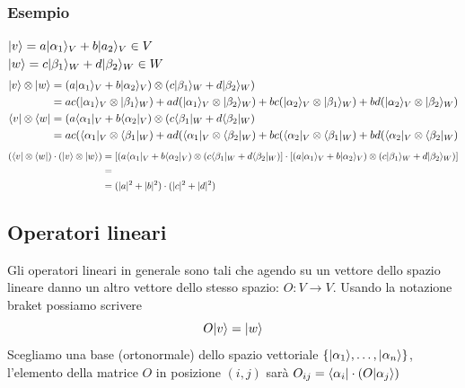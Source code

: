 \documentclass[12pt, a4paper]{report}
\begin{document}
\subsubsection{Esempio}
$| v \rangle = a| \alpha_{1} \rangle_{V}+b| a_{2} \rangle_{V}\in V$\\
$| w \rangle = c| \beta_{1} \rangle_{W}+d| \beta_{2} \rangle_{W}\in W$ 
\begin{equation*}
    \begin{split}
        | v \rangle\otimes| w \rangle & = (a| \alpha_{1} \rangle_{V}+b| \alpha_{2} \rangle_{V})\otimes(c| \beta_{1} \rangle_{W}+d| \beta_{2} \rangle_{W}) \\
        & = ac(| \alpha_{1} \rangle_{V}\otimes| \beta_{1} \rangle_{W})+ad(| \alpha_{1} \rangle_{V}\otimes| \beta_{2} \rangle_{W})+bc(| \alpha_{2} \rangle_{V}\otimes| \beta_{1} \rangle_{W})+bd(| \alpha_{2} \rangle_{V}\otimes| \beta_{2} \rangle_{W}) \\
        \langle v |\otimes\langle w | & = (a\langle \alpha_{1} |_{V}+b\langle \alpha_{2} |_{V})\otimes(c\langle \beta_{1} |_{W}+d\langle \beta_{2} |_{W}) \\
        & = ac(\langle \alpha_{1} |_{V}\otimes\langle \beta_{1} |_{W})+ad(\langle \alpha_{1} |_{V}\otimes\langle \beta_{2} |_{W})+bc(\langle \alpha_{2} |_{V}\otimes\langle \beta_{1} |_{W})+bd(\langle \alpha_{2} |_{V}\otimes\langle \beta_{2} |_{W})
    \end{split}
\end{equation*}
\footnotesize
\begin{equation*}
    \begin{split}
        (\langle v |\otimes\langle w |)\cdot(| v \rangle\otimes| w \rangle) & = [(a\langle \alpha_{1} |_{V}+b\langle \alpha_{2} |_{V})\otimes(c\langle \beta_{1} |_{W}+d\langle \beta_{2} |_{W})]\cdot[(a| \alpha_{1} \rangle_{V}+b| \alpha_{2} \rangle_{V})\otimes(c| \beta_{1} \rangle_{W}+d| \beta_{2} \rangle_{W})] \\
        & = \\
        & = (|a|^{2}+|b|^{2})\cdot(|c|^{2}+|d|^{2})
    \end{split}
\end{equation*}
\normalsize
\subsection{Operatori lineari}
Gli operatori lineari in generale sono tali che agendo su un vettore dello spazio lineare danno un altro vettore dello stesso spazio: $O:V\rightarrow V$. Usando la notazione braket possiamo scrivere \begin{equation*}
    O| v \rangle=| w \rangle
\end{equation*}
Scegliamo una base (ortonormale) dello spazio vettoriale $\left\{| \alpha_{1} \rangle,\ldots,| \alpha_{n} \rangle\right\}$, l'elemento della matrice $O$ in posizione $(i,j)$ sarà $O_{ij}=\langle \alpha_{i} |\cdot(O| \alpha_{j} \rangle)$
\end{document}
